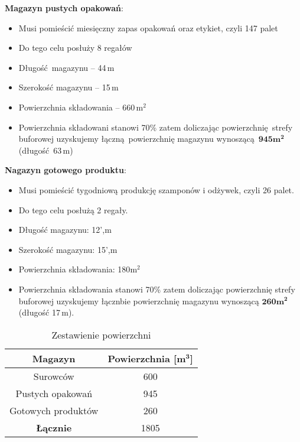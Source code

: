 \textbf{Magazyn pustych opakowań}:
\begin{itemize}
	\item Musi pomieścić miesięczny zapas opakowań oraz etykiet, czyli 147 palet
	\item Do tego celu posłuży 8 regałów
	\item Długość magazynu -- 44\,m
	\item Szerokość magazynu -- 15\,m
	\item Powierzchnia składowania -- 660\,$\mathrm{m^{2}}$
	\item Powierzchnia składowani stanowi 70\% zatem doliczając powierzchnię strefy buforowej uzyskujemy łączną powierzchnię magazynu wynoszącą $\mathbf{945m^{2}}$ (długość 63\,m)
\end{itemize}\vspace{\baselineskip}

\textbf{Nagazyn gotowego produktu}:
\begin{itemize}
	\item Musi pomieścić tygodniową produkcję szamponów i odżywek, czyli 26 palet.
	\item Do tego celu posłużą 2 regały.
	\item Długość magazynu: 12',m
	\item Szerokość magazynu: 15',m
	\item Powierzchnia składowania: 180$\mathrm{m^{2}}$
	\item Powierzchnia składowania stanowi 70\% zatem doliczając powierzchnię strefy buforowej uzyskujemy łącznbie powierzchnię magazynu wynoszącą $\mathbf{260m^{2}}$ (długość 17\,m).
\end{itemize}

\begin{table}
	\centering
	\caption{Zestawienie powierzchni}
	\begin{tabular}{cc}
		\hline
		\textbf{Magazyn} & \textbf{Powierzchnia [$\mathbf{m^{3}}$]} \\
		\hline\hline
		Surowców & 600 \\
		Pustych opakowań & 945 \\
		Gotowych produktów & 260 \\
		\textbf{Łącznie} & 1805 \\
		\hline
	\end{tabular}
\end{table}

